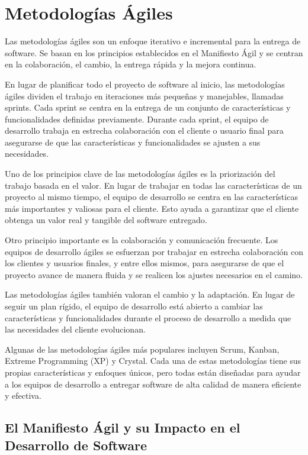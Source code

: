 \documentclass[executivepaper]{article}
\begin{document}
\newpage
\section{Metodologías Ágiles}
Las metodologías ágiles son un enfoque iterativo e incremental para la entrega de software. Se basan en los principios establecidos en el Manifiesto Ágil y se centran en la colaboración, el cambio, la entrega rápida y la mejora continua.

En lugar de planificar todo el proyecto de software al inicio, las metodologías ágiles dividen el trabajo en iteraciones más pequeñas y manejables, llamadas sprints. Cada sprint se centra en la entrega de un conjunto de características y funcionalidades definidas previamente. Durante cada sprint, el equipo de desarrollo trabaja en estrecha colaboración con el cliente o usuario final para asegurarse de que las características y funcionalidades se ajusten a sus necesidades.

Uno de los principios clave de las metodologías ágiles es la priorización del trabajo basada en el valor. En lugar de trabajar en todas las características de un proyecto al mismo tiempo, el equipo de desarrollo se centra en las características más importantes y valiosas para el cliente. Esto ayuda a garantizar que el cliente obtenga un valor real y tangible del software entregado.

Otro principio importante es la colaboración y comunicación frecuente. Los equipos de desarrollo ágiles se esfuerzan por trabajar en estrecha colaboración con los clientes y usuarios finales, y entre ellos mismos, para asegurarse de que el proyecto avance de manera fluida y se realicen los ajustes necesarios en el camino.

Las metodologías ágiles también valoran el cambio y la adaptación. En lugar de seguir un plan rígido, el equipo de desarrollo está abierto a cambiar las características y funcionalidades durante el proceso de desarrollo a medida que las necesidades del cliente evolucionan.

Algunas de las metodologías ágiles más populares incluyen Scrum, Kanban, Extreme Programming (XP) y Crystal. Cada una de estas metodologías tiene sus propias características y enfoques únicos, pero todas están diseñadas para ayudar a los equipos de desarrollo a entregar software de alta calidad de manera eficiente y efectiva.

\newpage
\subsection{El Manifiesto Ágil y su Impacto en el Desarrollo de Software}
\end{document}
